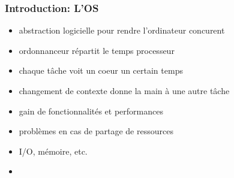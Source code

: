 \documentclass{beamer}
\begin{document}
\begin{frame}
  \frametitle{Introduction: L'OS}
  \begin{itemize}
  \item abstraction logicielle pour rendre l'ordinateur concurent
  \item ordonnanceur répartit le temps processeur
  \item chaque tâche voit un coeur un certain temps
  \item changement de contexte donne la main à une autre tâche
  \item gain de fonctionnalités et performances
  \item problèmes en cas de partage de ressources
  \item I/O, mémoire, etc.
  \item 
  \end{itemize}
\end{frame}
\end{document}
